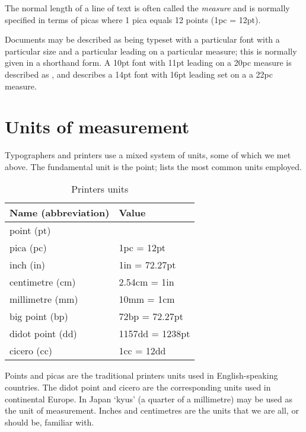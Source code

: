 \documentclass[10pt,letterpaper,extrafontsizes]{memoir}
\begin{document}
    The normal length of a line of text is often called the 
\emph{measure} and is normally specified in terms of
picas where 1 pica equals 12 points (1pc = 12pt).

    Documents may be described as being typeset with a particular font
with a particular size and a particular leading on a particular measure;
this is normally given in a shorthand form. 
A 10pt font with 11pt leading on a 20pc measure is described as
, and  describes a 14pt font
with 16pt leading set on a a 22pc measure.

\section{Units of measurement}

    Typographers and printers use a mixed system of units, some of which
we met above. The fundamental unit is the point;  lists 
the most common units employed.

\begin{table}
\centering
\caption{Printers units} \label{tab:units}
\begin{tabular}{ll} \toprule
Name (abbreviation) & Value \\ \midrule
point (pt)\index{point}\index{pt}          &            \\
pica (pc)\index{pica}\index{pc}           & 1pc = 12pt \\
inch (in)\index{inch}\index{in}           & 1in = 72.27pt \\
centimetre (cm)\index{centimetre}\index{cm}     & 2.54cm = 1in \\
millimetre (mm)\index{millimetre}\index{mm}     & 10mm = 1cm \\ 
big point (bp)\index{big point}\index{bp}      & 72bp = 72.27pt \\
didot point (dd)\index{didot point}\index{dd}    & 1157dd = 1238pt \\
cicero (cc)\index{cicero}\index{cc}         & 1cc = 12dd \\
\bottomrule
\end{tabular}
\end{table}

    Points and picas 
are the traditional printers units used in English-speaking countries. 
The didot point and cicero are the 
corresponding units used in continental Europe. In Japan `kyus'
(a quarter of a millimetre) may be used as the unit of measurement.
Inches and centimetres are the units that we
are all, or should be, familiar with.
\end{document}
